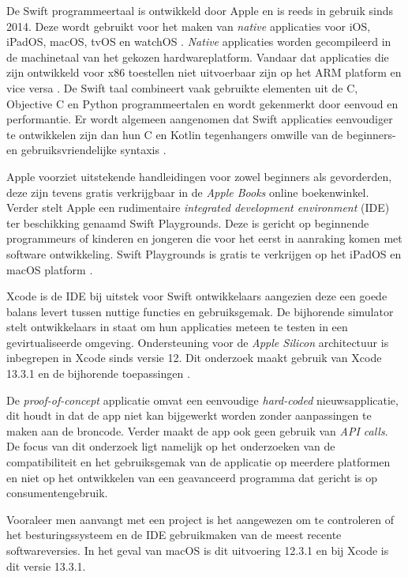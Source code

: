De Swift programmeertaal is ontwikkeld door Apple en is reeds in gebruik sinds 2014. Deze wordt gebruikt voor het maken van \textit{native} applicaties voor iOS, iPadOS, macOS, tvOS en watchOS \autocite{AppleDeveloper2022b}. \textit{Native} applicaties worden gecompileerd in de machinetaal van het gekozen hardwareplatform. Vandaar dat applicaties die zijn ontwikkeld voor x86 toestellen niet uitvoerbaar zijn op het ARM platform en vice versa \autocite{PCmag2022}. De Swift taal combineert vaak gebruikte elementen uit de C, Objective C en Python programmeertalen en wordt gekenmerkt door eenvoud en performantie. Er wordt algemeen aangenomen dat Swift applicaties eenvoudiger te ontwikkelen zijn dan hun C en Kotlin tegenhangers omwille van de beginners- en gebruiksvriendelijke syntaxis \autocite{AppleDeveloper2022b}.

Apple voorziet uitstekende handleidingen voor zowel beginners als gevorderden, deze zijn tevens gratis verkrijgbaar in de \textit{Apple Books} online boekenwinkel. Verder stelt Apple een rudimentaire \textit{integrated development environment} (IDE) ter beschikking genaamd Swift Playgrounds. Deze is gericht op beginnende programmeurs of kinderen en jongeren die voor het eerst in aanraking komen met software ontwikkeling. Swift Playgrounds is gratis te verkrijgen op het iPadOS en macOS platform \autocite{AppleDeveloper2022b}.

Xcode is de IDE bij uitstek voor Swift ontwikkelaars aangezien deze een goede balans levert tussen nuttige functies en gebruiksgemak. De bijhorende simulator stelt ontwikkelaars in staat om hun applicaties meteen te testen in een gevirtualiseerde omgeving. Ondersteuning voor de \textit{Apple Silicon} architectuur is inbegrepen in Xcode sinds versie 12. Dit onderzoek maakt gebruik van Xcode 13.3.1 en de bijhorende toepassingen \autocite{AppleDeveloper2022a}.

De \textit{proof-of-concept} applicatie omvat een eenvoudige \textit{hard-coded} nieuwsapplicatie, dit houdt in dat de app niet kan bijgewerkt  worden zonder aanpassingen te maken aan de broncode. Verder maakt de app ook geen gebruik van \textit{API calls}. De focus van dit onderzoek ligt namelijk op het onderzoeken van de compatibiliteit en het gebruiksgemak van de applicatie op meerdere platformen en niet op het ontwikkelen van een geavanceerd programma dat gericht is op consumentengebruik.

Vooraleer men aanvangt met een project is het aangewezen om te controleren of het besturingssysteem en de IDE gebruikmaken van de meest recente softwareversies. In het geval van macOS is dit uitvoering 12.3.1 en bij Xcode is dit versie 13.3.1.

